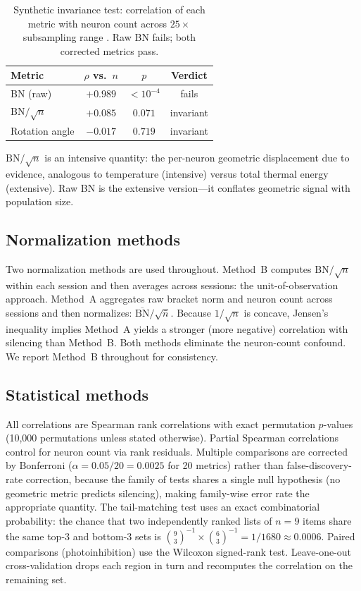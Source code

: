 \documentclass[9pt,lineno]{elife}
\begin{document}
\begin{table}[t]
\centering
\caption{Synthetic invariance test: correlation of each metric with neuron count across $25\times$ subsampling range \citep{dandi000017}. Raw BN fails; both corrected metrics pass.}
\label{tab:invariance}
\small
\begin{tabular}{lccc}
\toprule
Metric & $\rho$ vs.\ $n$ & $p$ & Verdict \\
\midrule
BN (raw) & $+0.989$ & $<10^{-4}$ & fails \\
BN$/\!\sqrt{n}$ & $+0.085$ & $0.071$ & invariant \\
Rotation angle & $-0.017$ & $0.719$ & invariant \\
\bottomrule
\end{tabular}
\end{table}

$\text{BN}/\!\sqrt{n}$ is an intensive quantity: the per-neuron geometric displacement due to evidence, analogous to temperature (intensive) versus total thermal energy (extensive). Raw BN is the extensive version---it conflates geometric signal with population size.

\subsection{Normalization methods}
\label{sec:normalization}

Two normalization methods are used throughout. Method~B computes $\text{BN}/\!\sqrt{n}$ within each session and then averages across sessions: the unit-of-observation approach. Method~A aggregates raw bracket norm and neuron count across sessions and then normalizes: $\overline{\text{BN}}/\!\sqrt{\bar{n}}$. Because $1/\!\sqrt{n}$ is concave, Jensen's inequality implies Method~A yields a stronger (more negative) correlation with silencing than Method~B. Both methods eliminate the neuron-count confound. We report Method~B throughout for consistency.

\subsection{Statistical methods}
\label{sec:stats}

All correlations are Spearman rank correlations with exact permutation $p$-values (10{,}000 permutations unless stated otherwise). Partial Spearman correlations control for neuron count via rank residuals. Multiple comparisons are corrected by Bonferroni ($\alpha = 0.05 / 20 = 0.0025$ for 20 metrics) rather than false-discovery-rate correction, because the family of tests shares a single null hypothesis (no geometric metric predicts silencing), making family-wise error rate the appropriate quantity. The tail-matching test uses an exact combinatorial probability: the chance that two independently ranked lists of $n = 9$ items share the same top-3 and bottom-3 sets is $\binom{9}{3}^{-1} \times \binom{6}{3}^{-1} = 1/1680 \approx 0.0006$. Paired comparisons (photoinhibition) use the Wilcoxon signed-rank test. Leave-one-out cross-validation drops each region in turn and recomputes the correlation on the remaining set.
\end{document}
